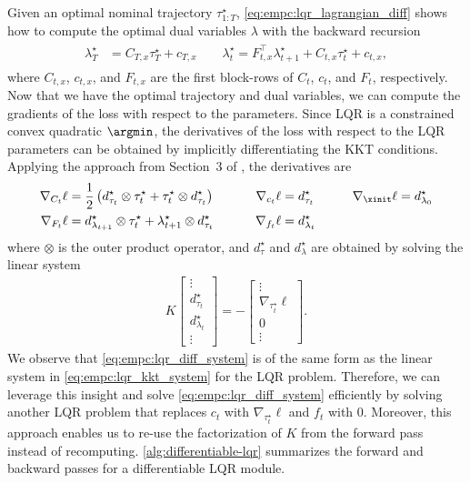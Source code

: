 Given an optimal nominal trajectory $\tau_{1:T}^\star$,
\cref{eq:empc:lqr_lagrangian_diff} shows how to compute the
optimal dual variables $\lambda$ with the backward recursion
\begin{align}
  \label{eq:empc:lqr_adjoint_lambdas}
  \begin{split}
    \lambda_T^\star &= C_{T,x}\tau_{T}^\star + c_{T,x} \qquad
    \lambda_t^\star = F_{t,x}^\top  \lambda_{t+1}^\star + C_{t,x}\tau_t^\star + c_{t,x},
\end{split}
\end{align}
where $C_{t,x}$, $c_{t,x}$, and $F_{t,x}$ are the first
block-rows of $C_t$, $c_t$, and $F_t$, respectively.
Now that we have the optimal trajectory and dual variables, we can compute
the gradients of the loss with respect to the parameters.
Since LQR is a constrained convex quadratic $\argmin$, the derivatives
of the loss with respect to the LQR parameters can be obtained by
implicitly differentiating the KKT conditions.
Applying the approach from Section~3 of \citet{amos2017optnet},
the derivatives are
\begin{align}
  \label{eq:empc:lqr_derivatives}
  \begin{aligned}
    \nabla_{C_t} \ell &=
    \frac{1}{2}\left(d_{\tau_t}^\star \otimes \tau_t^\star +
      \tau_t^\star \otimes d_{\tau_t}^\star \right)\qquad &
    \; \nabla_{c_t} \ell &= d_{\tau_t}^\star \qquad &
      \nabla_{\xinit} \ell &= d_{\lambda_0}^\star \\
    \nabla_{F_t} \ell &=
    d_{\lambda_{t+1}}^\star \otimes \tau_t^\star +
    \lambda_{t+1}^\star \otimes d_{\tau_t}^\star\qquad  &
    \; \nabla_{f_t} \ell &= d_{\lambda_t}^\star \\
\end{aligned}
\end{align}
where $\otimes$ is the outer product operator,
and $d_\tau^\star$ and $d_\lambda^\star$ are obtained by solving
the linear system
\begin{align}
  \label{eq:empc:lqr_diff_system}
  K
  \begin{bmatrix}
    \vdots\\
    d_{\tau_t}^\star \\
    d_{\lambda_t}^\star \\
    \vdots
  \end{bmatrix}
  = -
  \begin{bmatrix}
    \vdots \\
    \nabla_{\tau_t^\star} \ell \\
    0 \\
    \vdots
  \end{bmatrix}.
\end{align}
We observe that \cref{eq:empc:lqr_diff_system} is of the same form
as the linear system in \cref{eq:empc:lqr_kkt_system} for the LQR problem.
Therefore, we can leverage this insight and solve \cref{eq:empc:lqr_diff_system}
efficiently by solving another LQR problem that replaces
$c_t$ with $\nabla_{\tau_t^\star} \ell$ and $f_t$ with 0.
Moreover, this approach enables us to re-use the factorization of $K$ from the
forward pass instead of recomputing.
\cref{alg:differentiable-lqr} summarizes the forward and backward passes for
a differentiable LQR module.

